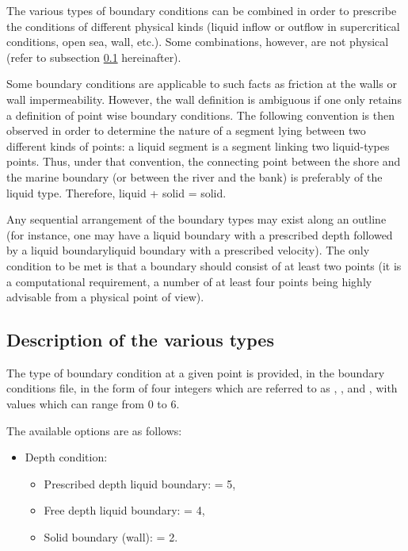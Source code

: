 The various types of boundary conditions can be combined in order to prescribe
the conditions of different physical kinds (liquid inflow or outflow in
supercritical conditions, open sea, wall, etc.). Some combinations, however,
are not physical (refer to subsection \ref{sec:descr_bnd} hereinafter).

Some boundary conditions are applicable to such facts as friction at the walls
or wall impermeability. However, the wall definition is ambiguous if one only
retains a definition of point wise boundary conditions. The following
convention is then observed in order to determine the nature of a segment lying
between two different kinds of points: a liquid segment is a segment linking
two liquid-types points. Thus, under that convention, the connecting point
between the shore and the marine boundary (or between the river and the bank)
is preferably of the liquid type. Therefore, liquid + solid = solid.

Any sequential arrangement of the boundary types may exist along an outline
(for instance, one may have a liquid boundary with a prescribed depth followed
by a liquid boundaryliquid boundary with a prescribed velocity). The only
condition to be met is that a boundary should consist of at least two points
(it is a computational requirement, a number of at least four points being
highly advisable from a physical point of view).


\subsection{Description of the various types}
\label{sec:descr_bnd}

The type of boundary condition at a given point is provided, in the boundary
conditions file, in the form of four integers which are referred to as
, ,  and ,
with values which can range from 0 to 6.

The available options are as follows:

\begin{itemize}
\item Depth condition:

\begin{itemize}
\item Prescribed depth liquid boundary:  = 5,

\item Free depth liquid boundary:  = 4,

\item Solid boundary (wall):  = 2.
\end{itemize}
\end{itemize}

